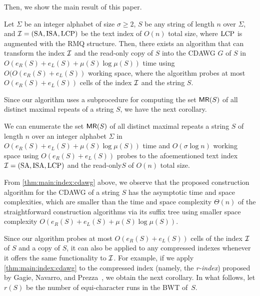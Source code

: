 \documentclass{article}
\begin{document}
Then, we show the main result of this paper. 

\begin{theorem}\label{thm:main:index:cdawg}
  Let
  $\Sigma$ be an integer alphabet of size $\sigma \ge 2$, 
  $S$ be any string of length $n$ over $\Sigma$, and
  $\mathcal{I} = (\mathrm{SA}, \mathrm{ISA}, \mathrm{LCP})$ be the text index of $O(n)$ total size, where $\mathrm{LCP}$ is augmented with the RMQ structure. Then, there exists an algorithm that can transform the index $\mathcal{I}$ and the read-only copy of $S$ into the CDAWG $G$ of $S$
  in $O(e_R(S) + e_L(S) + \mu(S)\log\mu(S))$ time
  using
  $O(O(e_R(S) + e_L(S))$ working space,
  where the algorithm probes at most $O(e_R(S) + e_L(S))$ cells of the index $\mathcal{I}$ and the string $S$. 
\end{theorem}

Since our algorithm uses a subprocedure for computing the set $\textsf{MR}(S)$ of all distinct maximal repeats of a string $S$, we have the next corollary.


\begin{corollary}\label{cor:main:index:maxrep}
We can enumerate the set $\textsf{MR}(S)$ of all distinct maximal repeats a string $S$ of length $n$ over an integer alphabet $\Sigma$ in $O(e_R(S)+e_L(S) + \mu(S)\log \mu(S))$ time and $O(\sigma \log n)$ working space
  using $O(e_R(S) + e_L(S))$ probes to the afoementioned text index $\mathcal{I} = (\mathrm{SA}, \mathrm{ISA}, \mathrm{LCP})$ and the read-only$S$ of $O(n)$ total size. 
\end{corollary}

From \cref{thm:main:index:cdawg} above, we observe that the proposed construction algorithm for the CDAWG of a string $S$ has the asymptotic time and space complexities, which are smaller than the time and space complexity $\Theta(n)$ of the straightforward construction algorithms via its suffix tree using smaller space complexity $O(e_R(S)+e_L(S) + \mu(S)\log \mu(S))$.


Since our algorithm probes at most $O(e_R(S) + e_L(S))$ cells of the index $\mathcal{I}$ of $S$ and a copy of $S$, it can also be applied to any compressed indexes whenever it offers the same functionality to $\mathcal{I}$. For example, if we apply \cref{thm:main:index:cdawg} to the compressed index (namely, the \textit{r-index}) proposed by Gagie, Navarro, and Prezza~\cite{gagie:navarro:prezza2020fully}, we obtain the next corollary. In what follows, let $r(S)$ be the number of equi-character runs in the BWT of~$S$. 
\end{document}
